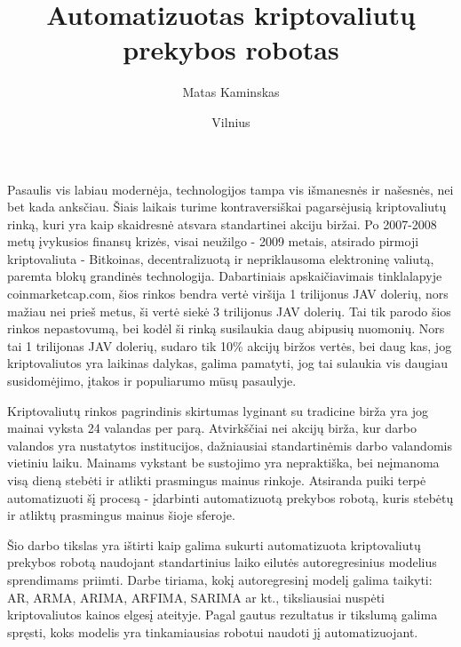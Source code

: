 \documentclass{VUMIFInfKursinis}
\institute{Informatikos institutas}  %
\title{Automatizuotas kriptovaliutų prekybos robotas}
\author{Matas Kaminskas}
\date{Vilnius \\ \the\year}
\begin{document}
\maketitle

\tableofcontents

Pasaulis vis labiau modernėja, technologijos tampa vis išmanesnės ir našesnės, nei bet kada anksčiau. Šiais laikais turime kontraversiškai pagarsėjusią
kriptovaliutų rinką, kuri yra kaip skaidresnė atsvara standartinei akciju biržai. Po 2007-2008 metų įvykusios finansų krizės,
visai neužilgo - \cite{SatBitcoin}2009 metais, atsirado pirmoji kriptovaliuta - Bitkoinas, decentralizuotą ir nepriklausoma elektroninę valiutą, paremta
blokų grandinės technologija. Dabartiniais apskaičiavimais tinklalapyje coinmarketcap.com, šios rinkos bendra vertė viršija 1 trilijonus JAV dolerių,
nors mažiau nei prieš metus, ši vertė siekė 3 trilijonus JAV dolerių. Tai tik parodo šios rinkos nepastovumą, bei kodėl ši rinką susilaukia
daug abipusių nuomonių. Nors tai 1 trilijonas JAV dolerių, sudaro tik 10\% akcijų biržos vertės, bei daug kas, jog kriptovaliutos yra laikinas dalykas,
galima pamatyti, jog tai sulaukia vis daugiau susidomėjimo, įtakos ir populiarumo mūsų pasaulyje.    

Kriptovaliutų rinkos pagrindinis skirtumas lyginant su tradicine birža yra jog mainai vyksta 24 valandas per parą. Atvirkščiai nei akcijų birža, kur
darbo valandos yra nustatytos institucijos, dažniausiai standartinėmis darbo valandomis vietiniu laiku. Mainams vykstant be sustojimo yra nepraktiška,
bei neįmanoma visą dieną stebėti ir atlikti prasmingus mainus rinkoje. Atsiranda puiki terpė automatizuoti šį procesą - įdarbinti automatizuotą prekybos
robotą, kuris stebėtų ir atliktų prasmingus mainus šioje sferoje.

Šio darbo tikslas yra ištirti kaip galima sukurti automatizuota kriptovaliutų prekybos robotą naudojant standartinius laiko eilutės autoregresinius modelius
sprendimams priimti. Darbe tiriama, kokį autoregresinį modelį galima taikyti: AR, ARMA, ARIMA, ARFIMA, SARIMA ar kt., tiksliausiai nuspėti kriptovaliutos
kainos elgesį ateityje. Pagal gautus rezultatus ir tikslumą galima spręsti, koks modelis yra tinkamiausias robotui naudoti jį automatizuojant.
\end{document}

